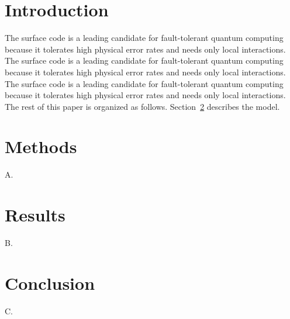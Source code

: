 \documentclass{article}
\begin{document}
\section{Introduction}
The surface code is a leading candidate for fault-tolerant quantum computing because it tolerates high physical error rates and needs only local interactions. The surface code is a leading candidate for fault-tolerant quantum computing because it tolerates high physical error rates and needs only local interactions. The surface code is a leading candidate for fault-tolerant quantum computing because it tolerates high physical error rates and needs only local interactions.
The rest of this paper is organized as follows. Section~\ref{sec:m} describes the model.
\section{Methods}\label{sec:m}A.
\section{Results}B.
\section{Conclusion}C.
\end{document}
